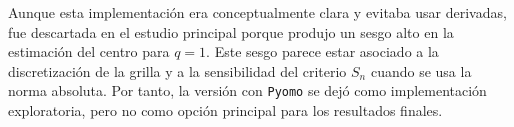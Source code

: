 Aunque esta implementación era conceptualmente clara y evitaba usar derivadas, fue descartada en el estudio principal porque produjo un sesgo alto en la estimación del centro para \(q=1\). Este sesgo parece estar asociado a la discretización de la grilla y a la sensibilidad del criterio \(S_n\) cuando se usa la norma absoluta. Por tanto, la versión con \texttt{Pyomo} se dejó como implementación exploratoria, pero no como opción principal para los resultados finales.


